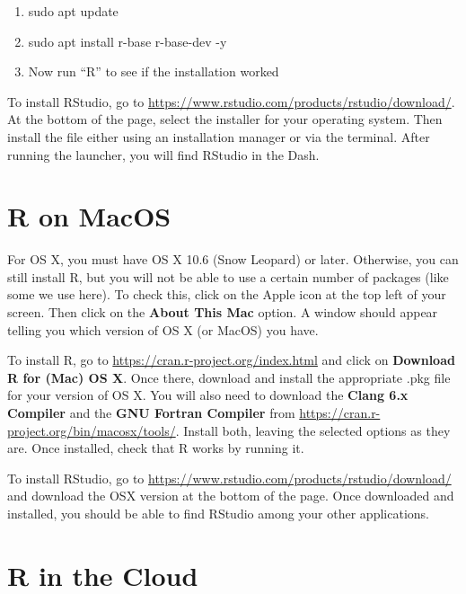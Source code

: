 \documentclass[
]{book}
\providecommand{\tightlist}{%
  \setlength{\itemsep}{0pt}\setlength{\parskip}{0pt}}
\begin{document}
\begin{enumerate}
\def\labelenumi{\arabic{enumi}.}
\tightlist
\item
  sudo apt update
\item
  sudo apt install r-base r-base-dev -y
\item
  Now run ``R'' to see if the installation worked
\end{enumerate}

To install RStudio, go to \url{https://www.rstudio.com/products/rstudio/download/}. At the bottom of the page, select the installer for your operating system. Then install the file either using an installation manager or via the terminal. After running the launcher, you will find RStudio in the Dash.

\section{R on MacOS}\label{r-on-macos}

For OS X, you must have OS X 10.6 (Snow Leopard) or later. Otherwise, you can still install R, but you will not be able to use a certain number of packages (like some we use here). To check this, click on the Apple icon at the top left of your screen. Then click on the \textbf{About This Mac} option. A window should appear telling you which version of OS X (or MacOS) you have.

To install R, go to \url{https://cran.r-project.org/index.html} and click on \textbf{Download R for (Mac) OS X}. Once there, download and install the appropriate .pkg file for your version of OS X. You will also need to download the \textbf{Clang 6.x Compiler} and the \textbf{GNU Fortran Compiler} from \url{https://cran.r-project.org/bin/macosx/tools/}. Install both, leaving the selected options as they are. Once installed, check that R works by running it.

To install RStudio, go to \url{https://www.rstudio.com/products/rstudio/download/} and download the OSX version at the bottom of the page. Once downloaded and installed, you should be able to find RStudio among your other applications.

\section{R in the Cloud}\label{r-in-the-cloud}
\end{document}
